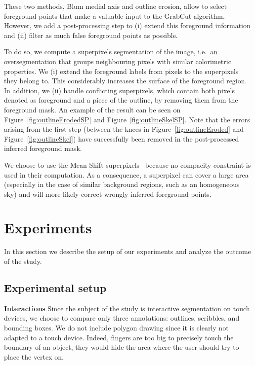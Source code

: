 These two methods, Blum medial axis and outline erosion,
allow to select foreground points that make a valuable input
to the GrabCut algorithm.
However, we add a post-processing step to (i) extend this foreground
information and (ii) filter as much false foreground points as possible.


To do so, we compute a superpixels segmentation of the image,
i.e.\ an oversegmentation that groups neighbouring pixels
with similar colorimetric properties.
We (i) extend the foreground labels from pixels
to the superpixels they belong to.
This considerably increases the surface of the foreground region.
In addition, we (ii) handle conflicting superpixels,
which contain both pixels denoted as foreground and a piece of the outline,
by removing them from the foreground mask. An example of the result
can be seen on Figure~\ref{fig:outlineErodedSP}
and Figure~\ref{fig:outlineSkelSP}.
Note that the errors arising from the first step
(between the knees in Figure~\ref{fig:outlineEroded}
and Figure~\ref{fig:outlineSkel})
have successfully been removed
in the post-processed inferred foreground mask.


We choose to use the Mean-Shift superpixels~\cite{comaniciu2002mean}
because no compacity constraint is used in their computation.
As a consequence, a superpixel can cover a large area
(especially in the case of similar background regions,
such as an homogeneous sky) and will more likely correct
wrongly inferred foreground points.




\section{Experiments}%
\label{sec:experiment}


In this section we describe the setup of our experiments
and analyze the outcome of the study.


\subsection{Experimental setup}


\textbf{Interactions}
Since the subject of the study is interactive segmentation on touch devices,
we choose to compare only three annotations:
outlines, scribbles, and bounding boxes.
We do not include polygon drawing since
it is clearly not adapted to a touch device.
Indeed, fingers are too big to precisely touch the boundary of an object,
they would hide the area where the user should try to place the vertex on.


